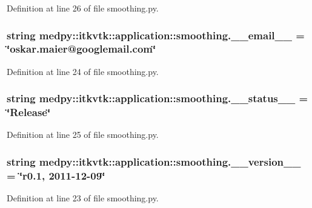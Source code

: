 Definition at line 26 of file smoothing.py.

\hypertarget{namespacemedpy_1_1itkvtk_1_1application_1_1smoothing_a42abb1df03fedc7d5aef1e83b9766692}{
\subsubsection[{\_\-\_\-email\_\-\_\-}]{\setlength{\rightskip}{0pt plus 5cm}string {\bf medpy::itkvtk::application::smoothing.\_\-\_\-email\_\-\_\-} = \char`\"{}oskar.maier@googlemail.com\char`\"{}}}
\label{namespacemedpy_1_1itkvtk_1_1application_1_1smoothing_a42abb1df03fedc7d5aef1e83b9766692}


Definition at line 24 of file smoothing.py.

\hypertarget{namespacemedpy_1_1itkvtk_1_1application_1_1smoothing_ae438a9f918ff1bc154948aef74d4a51c}{
\subsubsection[{\_\-\_\-status\_\-\_\-}]{\setlength{\rightskip}{0pt plus 5cm}string {\bf medpy::itkvtk::application::smoothing.\_\-\_\-status\_\-\_\-} = \char`\"{}Release\char`\"{}}}
\label{namespacemedpy_1_1itkvtk_1_1application_1_1smoothing_ae438a9f918ff1bc154948aef74d4a51c}


Definition at line 25 of file smoothing.py.

\hypertarget{namespacemedpy_1_1itkvtk_1_1application_1_1smoothing_a177e8fcf326df5e6b73ba3ba05c7ce5a}{
\subsubsection[{\_\-\_\-version\_\-\_\-}]{\setlength{\rightskip}{0pt plus 5cm}string {\bf medpy::itkvtk::application::smoothing.\_\-\_\-version\_\-\_\-} = \char`\"{}r0.1, 2011-\/12-\/09\char`\"{}}}
\label{namespacemedpy_1_1itkvtk_1_1application_1_1smoothing_a177e8fcf326df5e6b73ba3ba05c7ce5a}


Definition at line 23 of file smoothing.py.

